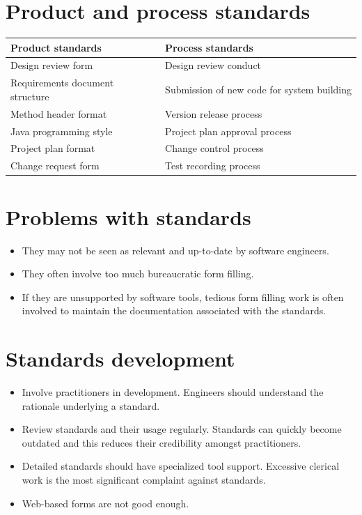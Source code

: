 \section {Product and process standards}
\begin{table}[h!]
\centering
\begin{tabular}{ |p{6cm}|p{6cm}|}
\hline
Product standards & Process standards\\
\hline
\hline
Design review form & Design review conduct\\
Requirements document structure & Submission of new code for system building\\
\hline
Method header format & Version release process\\
\hline
Java programming style & Project plan approval process\\
\hline
Project plan format & Change control process\\
\hline
Change request form & Test recording process\\
\hline
\end{tabular}

\label{table:T7_2}
\end{table}

\section {Problems with standards}
\begin{itemize}

\item They may not be seen as relevant and up-to-date by software engineers.

\item They often involve too much bureaucratic form filling.

\item If they are unsupported by software tools, tedious form filling work is often involved to maintain the documentation associated with the standards.


\end{itemize}
\section {Standards development}
\begin{itemize}
\item Involve practitioners in development. Engineers should understand the rationale underlying a standard.

\item Review standards and their usage regularly. Standards can quickly become outdated and this reduces their credibility amongst practitioners.

\item Detailed standards should have specialized tool support. Excessive clerical work is the most significant complaint against standards.

  \item Web-based forms are not good enough.
\end{itemize}
